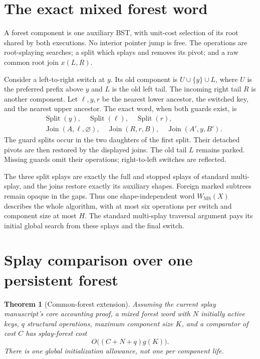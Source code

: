 \documentclass[11pt]{article}
\newtheorem{theorem}{Theorem}
\newcommand{\MS}{\operatorname{MS}}
\begin{document}
\section{The exact mixed forest word}

A forest component is one auxiliary BST, with unit-cost selection of
its root shared by both executions. No interior pointer jump is free.
The operations are root-splaying searches; a split which splays and
removes its pivot; and a raw common root join $x(L,R)$.

Consider a left-to-right switch at $y$. Its old component is
$U\cup\{y\}\cup L$, where $U$ is the preferred prefix above $y$ and
$L$ is the old left tail. The incoming right tail $R$ is another
component. Let $\ell,y,r$ be the nearest lower ancestor, the switched
key, and the nearest upper ancestor. The exact word, when both guards
exist, is
\[
 \begin{split}
 &\operatorname{Split}(y),\quad
  \operatorname{Split}(\ell),\quad
  \operatorname{Split}(r),\\
 &\operatorname{Join}(A,\ell,\varnothing),\quad
  \operatorname{Join}(R,r,B),\quad
  \operatorname{Join}(A',y,B').
 \end{split}                                             \tag{2}
\]
The guard splits occur in the two daughters of the first split.
Their detached pivots are then restored by the displayed joins.
The old tail $L$ remains parked. Missing guards omit their operations;
right-to-left switches are reflected.

The three split splays are exactly the full and stopped splays of
standard multi-splay, and the joins restore exactly its auxiliary
shapes. Foreign marked subtrees remain opaque in the gaps. Thus one
shape-independent word $W_{\MS}(X)$ describes the whole algorithm,
with at most six operations per switch and component size at most $H$.
The standard multi-splay traversal argument pays its initial global
search from these splays and the final switch.

\section{Splay comparison over one persistent forest}

\begin{theorem}[Common-forest extension]\label{thm:forest}
Assuming the current splay manuscript's core accounting proof, a
mixed forest word with $N$ initially active keys, $q$ structural
operations, maximum component size $K$, and a comparator of cost $C$
has splay-forest cost
\[
 O\bigl((C+N+q)g(K)\bigr).
\]
There is one global initialization allowance, not one per component life.
\end{theorem}
\end{document}
